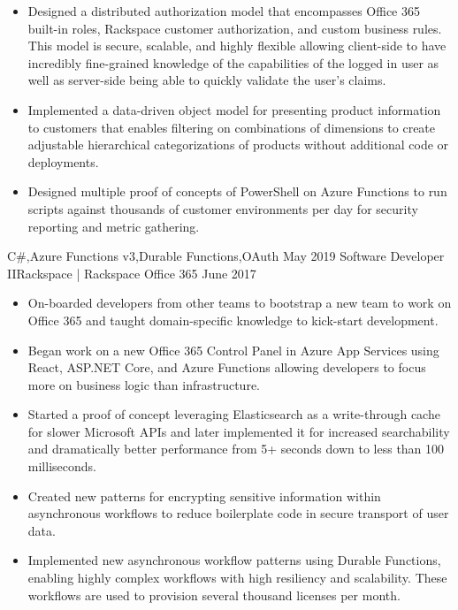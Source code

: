 \begin{experiences}
{\begin{itemize}
                        \item Designed a distributed authorization model that encompasses Office 365 built-in roles, Rackspace customer authorization, and custom business rules. This model is secure, scalable, and highly flexible allowing client-side to have incredibly fine-grained knowledge of the capabilities of the logged in user as well as server-side being able to quickly validate the user's claims.
                        \item Implemented a data-driven object model for presenting product information to customers that enables filtering on combinations of dimensions to create adjustable hierarchical categorizations of products without additional code or deployments.
                        \item Designed multiple proof of concepts of PowerShell on Azure Functions to run scripts against thousands of customer environments per day for security reporting and metric gathering.
                      \end{itemize}
                    }
                    {C\#,Azure Functions v3,Durable Functions,OAuth}
  \emptySeparator
  \experience
    {May 2019}     {Software Developer II}{Rackspace | Rackspace Office 365}
    {June 2017}    {
                      \begin{itemize}
                        \item On-boarded developers from other teams to bootstrap a new team to work on Office 365 and taught domain-specific knowledge to kick-start development.
                        \item Began work on a new Office 365 Control Panel in Azure App Services using React, ASP.NET Core, and Azure Functions allowing developers to focus more on business logic than infrastructure.
                        \item Started a proof of concept leveraging Elasticsearch as a write-through cache for slower Microsoft APIs and later implemented it for increased searchability and dramatically better performance from 5+ seconds down to less than 100 milliseconds.
                        \item Created new patterns for encrypting sensitive information within asynchronous workflows to reduce boilerplate code in secure transport of user data.
                        \item Implemented new asynchronous workflow patterns using Durable Functions, enabling highly complex workflows with high resiliency and scalability. These workflows are used to provision several thousand licenses per month.

\end{itemize}}
\end{experiences}
